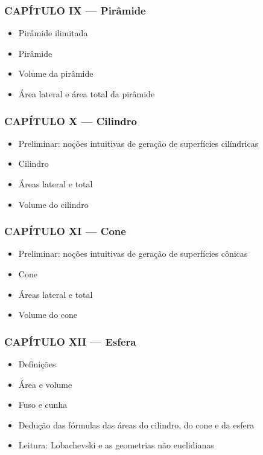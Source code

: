 \documentclass[a4paper,12pt]{article}[abntex2]
\begin{document}
\subsubsection*{CAPÍTULO IX — Pirâmide}

\begin{itemize}
\item Pirâmide ilimitada
\item Pirâmide
\item Volume da pirâmide
\item Área lateral e área total da pirâmide
\end{itemize}
\subsubsection*{CAPÍTULO X — Cilindro}

\begin{itemize}
\item Preliminar: noções intuitivas de geração de superfícies cilíndricas
\item Cilindro
\item Áreas lateral e total
\item Volume do cilindro
\end{itemize}
\subsubsection*{CAPÍTULO XI — Cone}

\begin{itemize}
\item Preliminar: noções intuitivas de geração de superfícies cônicas
\item Cone
\item Áreas lateral e total
\item Volume do cone
\end{itemize}
\subsubsection*{CAPÍTULO XII — Esfera}

\begin{itemize}
\item Definições
\item Área e volume
\item Fuso e cunha
\item Dedução das fórmulas das áreas do cilindro, do cone e da esfera
\item Leitura: Lobachevski e as geometrias não euclidianas
\end{itemize}
\end{document}
